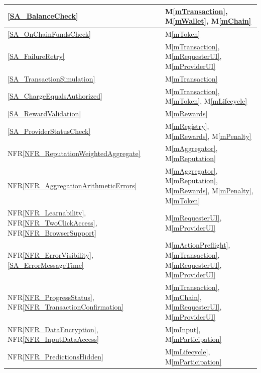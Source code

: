 \documentclass[12pt, titlepage]{article}
\newcommand{\mref}[1]{M\ref{#1}}
\newcommand{\nfrref}[1]{NFR\ref{#1}}
\begin{document}
\begin{longtable}{|p{}|p{}|}
\ref{SA_BalanceCheck}
& \mref{mTransaction}, \mref{mWallet}, \mref{mChain} \\
\hline

\ref{SA_OnChainFundsCheck}
& \mref{mToken} \\
\hline

\ref{SA_FailureRetry}
& \mref{mTransaction}, \mref{mRequesterUI}, \mref{mProviderUI} \\
\hline

\ref{SA_TransactionSimulation}
& \mref{mTransaction} \\
\hline

\ref{SA_ChargeEqualsAuthorized}
& \mref{mTransaction}, \mref{mToken}, \mref{mLifecycle} \\
\hline

\ref{SA_RewardValidation}
& \mref{mRewards} \\
\hline

\ref{SA_ProviderStatusCheck}
& \mref{mRegistry}, \mref{mRewards}, \mref{mPenalty} \\
\hline

\nfrref{NFR_ReputationWeightedAggregate}
& \mref{mAggregator}, \mref{mReputation} \\
\hline

\nfrref{NFR_AggregationArithmeticErrors}
& \mref{mAggregator}, \mref{mReputation}, \mref{mRewards}, \mref{mPenalty},
\mref{mToken} \\
\hline

\nfrref{NFR_Learnability}, \nfrref{NFR_TwoClickAccess},
\nfrref{NFR_BrowserSupport}
& \mref{mRequesterUI}, \mref{mProviderUI} \\
\hline

\nfrref{NFR_ErrorVisibility}, \ref{SA_ErrorMessageTime}
& \mref{mActionPreflight}, \mref{mTransaction}, \mref{mRequesterUI},
\mref{mProviderUI} \\
\hline

\nfrref{NFR_ProgressStatus}, \nfrref{NFR_TransactionConfirmation}
& \mref{mTransaction}, \mref{mChain}, \mref{mRequesterUI},
\mref{mProviderUI} \\
\hline

\nfrref{NFR_DataEncryption}, \nfrref{NFR_InputDataAccess}
& \mref{mInput}, \mref{mParticipation} \\
\hline

\nfrref{NFR_PredictionsHidden}
& \mref{mLifecycle}, \mref{mParticipation} \\
\hline


\end{longtable}
\end{document}
